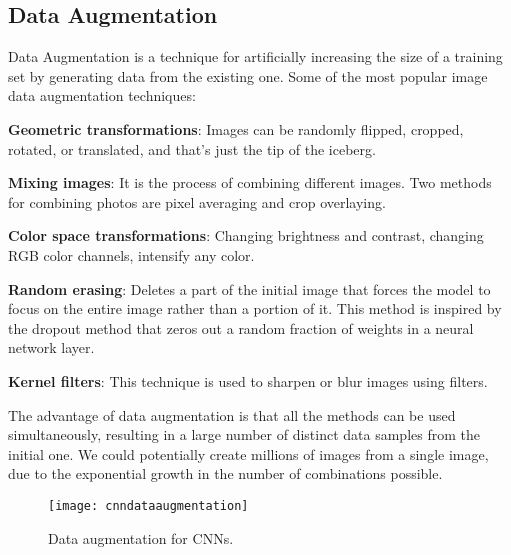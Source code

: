 	\subsection{Data Augmentation}
	\begin{bulletedlist}
		\item Data Augmentation is a technique for artificially increasing the size of a training set by generating data from the existing one. Some of the most popular image data augmentation techniques:
		\begin{bulletedlist}
			\item \textbf{Geometric transformations}: Images can be randomly flipped, cropped, rotated, or translated, and that's just the tip of the iceberg.
			\item \textbf{Mixing images}: It is the process of combining different images. Two methods for combining photos are pixel averaging and crop overlaying.
			\item \textbf{Color space transformations}: Changing brightness and contrast, changing RGB color channels, intensify any color.
			\item \textbf{Random erasing}: Deletes a part of the initial image that forces the model to focus on the entire image rather than a portion of it.  This method is inspired by the dropout method that zeros out a random fraction of weights in a neural network layer.
			\item \textbf{Kernel filters}: This technique is used to sharpen or blur images using filters.
		\end{bulletedlist}
		\item The advantage of data augmentation is that all the methods can be used simultaneously, resulting in a large number of distinct data samples from the initial one. We could potentially create millions of images from a single image, due to the exponential growth in the number of combinations possible.
	\end{bulletedlist}

	\begin{figure}[tbh]
		\centering
		\texttt{[image: cnndataaugmentation]}
		\caption[Data augmentation for CNNs]{Data augmentation for CNNs.}
		\label{fig:cnndataaugmentation}
	\end{figure}

